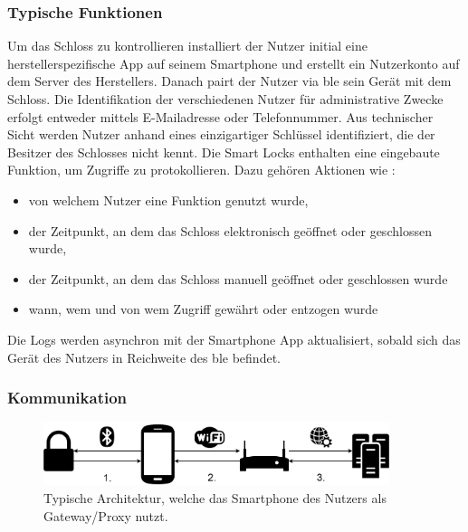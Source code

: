     \subsubsection{Typische Funktionen}
		Um das Schloss zu kontrollieren installiert der Nutzer initial eine herstellerspezifische App auf seinem Smartphone und erstellt ein Nutzerkonto auf dem Server des Herstellers. 
		Danach pairt der Nutzer via \gls{ble} sein Gerät mit dem Schloss.\cite{Ho2016} 
		Die Identifikation der verschiedenen Nutzer für administrative Zwecke erfolgt entweder mittels E-Mailadresse oder Telefonnummer. 
		Aus technischer Sicht werden Nutzer anhand eines einzigartiger Schlüssel identifiziert, die der Besitzer des Schlosses nicht kennt.\cite{Fuller2017} 
		Die Smart Locks enthalten eine eingebaute Funktion, um Zugriffe zu protokollieren. 
		Dazu gehören Aktionen wie \cite{Fuller2017}:
		\begin{itemize}[noitemsep]
			\item von welchem Nutzer eine Funktion genutzt wurde, 
			\item der Zeitpunkt, an dem das Schloss elektronisch geöffnet oder geschlossen wurde,
			\item der Zeitpunkt, an dem das Schloss manuell geöffnet oder geschlossen wurde
			\item wann, wem und von wem Zugriff gewährt oder entzogen wurde
		\end{itemize}
		Die Logs werden asynchron mit der Smartphone App aktualisiert, sobald sich das Gerät des Nutzers in Reichweite des \gls{ble} befindet\citeauthor{Ho2016}.
	
	\subsubsection{Kommunikation}
	    \begin{figure}[H]
    		\centering
    		\includegraphics[width=0.9\textwidth]{graphics/gateway_arch.png}
    		\caption{Typische Architektur, welche das Smartphone des Nutzers als Gateway/Proxy nutzt\cite{Ho2016}.}
    		\label{fig:gateway_arch}
    	\end{figure}

